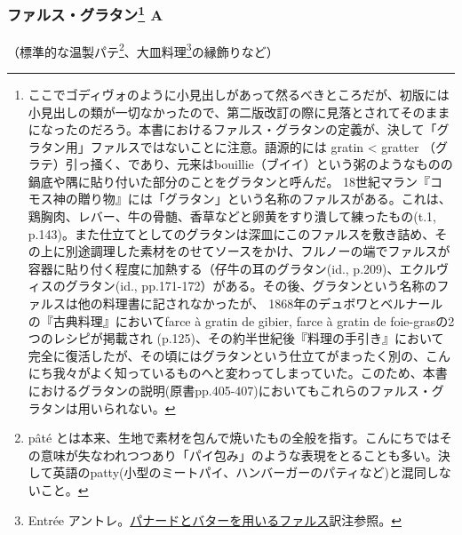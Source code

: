 \begin{recette}

\atoaki{}

\hypertarget{farce-gratin-a}{%
\subsubsection[ファルス・グラタン
A]{\texorpdfstring{ファルス・グラタン\footnote{ここでゴディヴォのように小見出しがあって然るべきところだが、初版には小見出しの類が一切なかったので、第二版改訂の際に見落とされてそのままになったのだろう。本書におけるファルス・グラタンの定義が、決して「グラタン用」ファルスではないことに注意。語源的には
  gratin \textless{} gratter
  （グラテ）引っ掻く、であり、元来はbouillie（ブイイ）という粥のようなものの鍋底や隅に貼り付いた部分のことをグラタンと呼んだ。
  18世紀マラン『コモス神の贈り物』には「グラタン」という名称のファルスがある。これは、鶏胸肉、レバー、牛の骨髄、香草などと卵黄をすり潰して練ったもの(t.1,
  p.143)。また仕立てとしてのグラタンは深皿にこのファルスを敷き詰め、その上に別途調理した素材をのせてソースをかけ、フルノーの端でファルスが容器に貼り付く程度に加熱する（仔牛の耳のグラタン(id.,
  p.209)、エクルヴィスのグラタン(id.,
  pp.171-172）がある。その後、グラタンという名称のファルスは他の料理書に記されなかったが、
  1868年のデュボワとベルナールの『古典料理』においてfarce à gratin de
  gibier, farce à gratin de foie-grasの2つのレシピが掲載され
  (p.125)、その約半世紀後『料理の手引き』において完全に復活したが、その頃にはグラタンという仕立てがまったく別の、こんにち我々がよく知っているものへと変わってしまっていた。このため、本書におけるグラタンの説明(原書pp.405-407)においてもこれらのファルス・グラタンは用いられない。}
A}{ファルス・グラタン A}}\label{farce-gratin-a}}



（標準的な温製パテ\footnote{pâté
  とは本来、生地で素材を包んで焼いたもの全般を指す。こんにちではその意味が失なわれつつあり「パイ包み」のような表現をとることも多い。決して英語のpatty(小型のミートパイ、ハンバーガーのパティなど)と混同しないこと。}、大皿料理\footnote{Entrée
  アントレ。\protect\hyperlink{panade-a}{パナードとバターを用いるファルス}訳注参照。}の縁飾りなど）


\end{recette}
